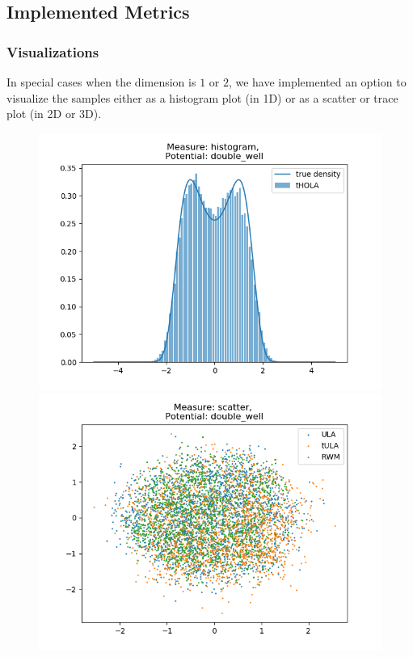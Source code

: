 \noindent 

\subsection{Implemented Metrics}

\subsubsection{Visualizations}
In special cases when the dimension is $1$ or $2$, we have implemented an option to visualize the samples either as a histogram plot (in 1D) or as a scatter or trace plot (in 2D or 3D).


\begin{figure}[H]
\centering
  \begin{minipage}[b]{0.3\textwidth}
  \centering
    \includegraphics[width=\textwidth]{Figures/histo_example.png}
  \end{minipage} %
  \begin{minipage}[b]{0.3\textwidth}
  \centering
    \includegraphics[width=\textwidth]{Figures/scatter_example.png}

\end{minipage}
\end{figure}
